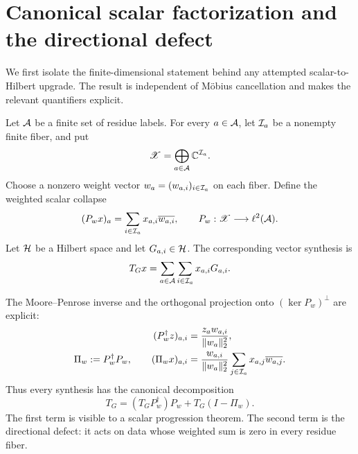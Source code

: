 \section{Canonical scalar factorization and the directional defect}
\label{sec:tpc42-canonical}

We first isolate the finite-dimensional statement behind any attempted
scalar-to-Hilbert upgrade.  The result is independent of M\"obius
cancellation and makes the relevant quantifiers explicit.

Let \(\mathcal A\) be a finite set of residue labels.  For every \(a\in\mathcal A\),
let \(\mathcal I_a\) be a nonempty finite fiber, and put
\begin{equation}
 \mathscr X=\bigoplus_{a\in\mathcal A}\mathbb C^{\mathcal I_a}.
 \label{eq:tpc42-fiber-domain}
\end{equation}
Choose a nonzero weight vector
\(w_a=(w_{a,i})_{i\in\mathcal I_a}\) on each fiber.  Define the weighted scalar
collapse
\begin{equation}
 (P_wx)_a
 =\sum_{i\in\mathcal I_a}x_{a,i}\overline{w_{a,i}},
 \qquad
 P_w:\mathscr X\longrightarrow\ell^2(\mathcal A).
 \label{eq:tpc42-weighted-collapse}
\end{equation}
Let \(\mathcal H\) be a Hilbert space and let
\(G_{a,i}\in\mathcal H\).  The corresponding vector synthesis is
\begin{equation}
 T_Gx=\sum_{a\in\mathcal A}\sum_{i\in\mathcal I_a}x_{a,i}G_{a,i}.
 \label{eq:tpc42-vector-synthesis}
\end{equation}

The Moore--Penrose inverse and the orthogonal projection onto
\((\ker P_w)^\perp\) are explicit:
\begin{align}
 (P_w^\dagger z)_{a,i}
 &=\frac{z_aw_{a,i}}{\|w_a\|_2^2},
 \label{eq:tpc42-P-dagger}\\
 \Pi_w:=P_w^\dagger P_w,
 \qquad
 (\Pi_wx)_{a,i}
 &=\frac{w_{a,i}}{\|w_a\|_2^2}
   \sum_{j\in\mathcal I_a}x_{a,j}\overline{w_{a,j}}.
 \label{eq:tpc42-P-projection}
\end{align}
Thus every synthesis has the canonical decomposition
\begin{equation}
 \boxed{
 T_G=(T_GP_w^\dagger)P_w+T_G(I-\Pi_w).}
 \label{eq:tpc42-canonical-splitting}
\end{equation}
The first term is visible to a scalar progression theorem.  The second
term is the directional defect: it acts on data whose weighted sum is
zero in every residue fiber.

